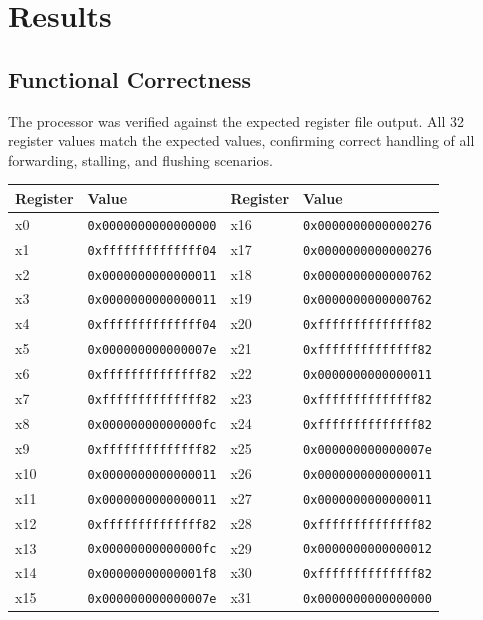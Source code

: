 \documentclass[12pt,a4paper]{article}
\begin{document}
\section{Results}

\subsection{Functional Correctness}
The processor was verified against the expected register file output. All 32 register values match the expected values, confirming correct handling of all forwarding, stalling, and flushing scenarios.

\begin{center}
\begin{tabular}{llll}
    \toprule
    \textbf{Register} & \textbf{Value} & \textbf{Register} & \textbf{Value} \\
    \midrule
    x0  & \texttt{0x0000000000000000} & x16 & \texttt{0x0000000000000276} \\
    x1  & \texttt{0xffffffffffffff04} & x17 & \texttt{0x0000000000000276} \\
    x2  & \texttt{0x0000000000000011} & x18 & \texttt{0x0000000000000762} \\
    x3  & \texttt{0x0000000000000011} & x19 & \texttt{0x0000000000000762} \\
    x4  & \texttt{0xffffffffffffff04} & x20 & \texttt{0xffffffffffffff82} \\
    x5  & \texttt{0x000000000000007e} & x21 & \texttt{0xffffffffffffff82} \\
    x6  & \texttt{0xffffffffffffff82} & x22 & \texttt{0x0000000000000011} \\
    x7  & \texttt{0xffffffffffffff82} & x23 & \texttt{0xffffffffffffff82} \\
    x8  & \texttt{0x00000000000000fc} & x24 & \texttt{0xffffffffffffff82} \\
    x9  & \texttt{0xffffffffffffff82} & x25 & \texttt{0x000000000000007e} \\
    x10 & \texttt{0x0000000000000011} & x26 & \texttt{0x0000000000000011} \\
    x11 & \texttt{0x0000000000000011} & x27 & \texttt{0x0000000000000011} \\
    x12 & \texttt{0xffffffffffffff82} & x28 & \texttt{0xffffffffffffff82} \\
    x13 & \texttt{0x00000000000000fc} & x29 & \texttt{0x0000000000000012} \\
    x14 & \texttt{0x00000000000001f8} & x30 & \texttt{0xffffffffffffff82} \\
    x15 & \texttt{0x000000000000007e} & x31 & \texttt{0x0000000000000000} \\
    \bottomrule
\end{tabular}
\end{center}
\end{document}
